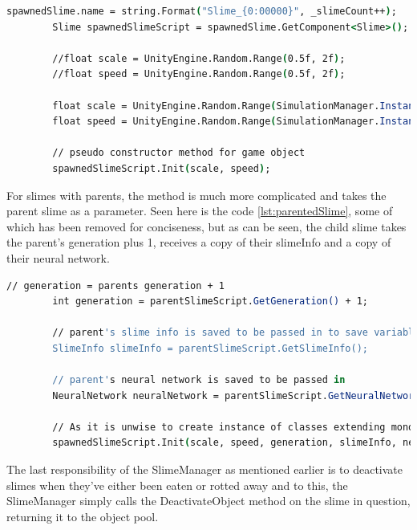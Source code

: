 \begin{lstlisting}[language=csh, caption=Parent-less Slime, label={lst:parentlessSlime}]
    spawnedSlime.name = string.Format("Slime_{0:00000}", _slimeCount++);
        Slime spawnedSlimeScript = spawnedSlime.GetComponent<Slime>();

        //float scale = UnityEngine.Random.Range(0.5f, 2f);
        //float speed = UnityEngine.Random.Range(0.5f, 2f);

        float scale = UnityEngine.Random.Range(SimulationManager.Instance().ScaleLowerBound, SimulationManager.Instance().ScaleUpperBound);
        float speed = UnityEngine.Random.Range(SimulationManager.Instance().SpeedLowerBound, SimulationManager.Instance().SpeedUpperBound);

        // pseudo constructor method for game object
        spawnedSlimeScript.Init(scale, speed);
\end{lstlisting}
\par
For slimes with parents, the method is much more complicated and takes the parent slime as a parameter. Seen here is the code \ref{lst:parentedSlime}, some of which has been removed for conciseness, but as can be seen, the child slime takes the parent's generation plus 1, receives a copy of their slimeInfo and a copy of their neural network.
\begin{lstlisting}[language=csh, caption=Slime with Parent, label={lst:parentedSlime}]
        // generation = parents generation + 1
        int generation = parentSlimeScript.GetGeneration() + 1;

        // parent's slime info is saved to be passed in to save variable
        SlimeInfo slimeInfo = parentSlimeScript.GetSlimeInfo();

        // parent's neural network is saved to be passed in
        NeuralNetwork neuralNetwork = parentSlimeScript.GetNeuralNetwork();

        // As it is unwise to create instance of classes extending monobehaviours using the new command, the init command is used as a pseudo constructor after the gameobject has been instantiated
        spawnedSlimeScript.Init(scale, speed, generation, slimeInfo, neuralNetwork);
\end{lstlisting}
\par
The last responsibility of the SlimeManager as mentioned earlier is to deactivate slimes when they've either been eaten or rotted away and to this, the SlimeManager simply calls the DeactivateObject method on the slime in question, returning it to the object pool.
